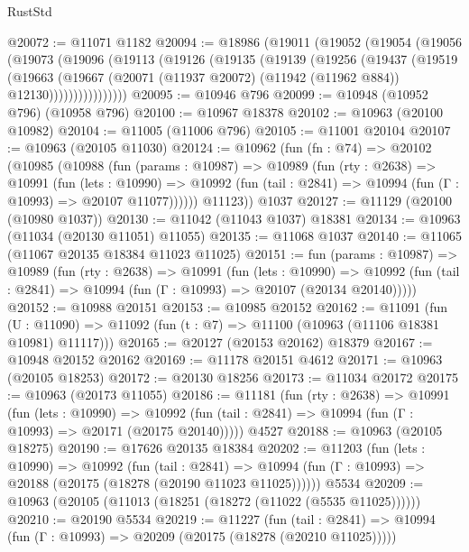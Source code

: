 \begin{lexlean}{RustStd}
\begin{coremodule}
@20072 := @11071 @1182
@20094 := @18986
    (@19011
      (@19052
        (@19054
          (@19056
            (@19073
              (@19096
                (@19113
                  (@19126
                    (@19135
                      (@19139
                        (@19256
                          (@19437
                            (@19519
                              (@19663
                                (@19667
                                  (@20071
                                    (@11937 @20072)
                                    (@11942 (@11962 @884))
                                    @12130))))))))))))))))
@20095 := @10946 @796
@20099 := @10948 (@10952 @796) (@10958 @796)
@20100 := @10967 @18378
@20102 := @10963 (@20100 @10982)
@20104 := @11005 (@11006 @796)
@20105 := @11001 @20104
@20107 := @10963 (@20105 @11030)
@20124 := @10962
    (fun (fn : @74) =>
    @20102
      (@10985
        (@10988
          (fun (params : @10987) =>
          @10989
            (fun (rty : @2638) =>
            @10991
              (fun (lets : @10990) =>
              @10992 (fun (tail : @2841) => @10994 (fun (Γ : @10993) => @20107 @11077))))))
        @11123))
    @1037
@20127 := @11129 (@20100 (@10980 @1037))
@20130 := @11042 (@11043 @1037) @18381
@20134 := @10963 (@11034 (@20130 @11051) @11055)
@20135 := @11068 @1037
@20140 := @11065 (@11067 @20135 @18384 @11023 @11025)
@20151 := fun (params : @10987) =>
  @10989
    (fun (rty : @2638) =>
    @10991
      (fun (lets : @10990) =>
      @10992 (fun (tail : @2841) => @10994 (fun (Γ : @10993) => @20107 (@20134 @20140)))))
@20152 := @10988 @20151
@20153 := @10985 @20152
@20162 := @11091
    (fun (U : @11090) => @11092 (fun (t : @7) => @11100 (@10963 (@11106 @18381 @10981) @11117)))
@20165 := @20127 (@20153 @20162) @18379
@20167 := @10948 @20152 @20162
@20169 := @11178 @20151 @4612
@20171 := @10963 (@20105 @18253)
@20172 := @20130 @18256
@20173 := @11034 @20172
@20175 := @10963 (@20173 @11055)
@20186 := @11181
    (fun (rty : @2638) =>
    @10991
      (fun (lets : @10990) =>
      @10992 (fun (tail : @2841) => @10994 (fun (Γ : @10993) => @20171 (@20175 @20140)))))
    @4527
@20188 := @10963 (@20105 @18275)
@20190 := @17626 @20135 @18384
@20202 := @11203
    (fun (lets : @10990) =>
    @10992
      (fun (tail : @2841) =>
      @10994 (fun (Γ : @10993) => @20188 (@20175 (@18278 (@20190 @11023 @11025))))))
    @5534
@20209 := @10963 (@20105 (@11013 (@18251 (@18272 (@11022 (@5535 @11025))))))
@20210 := @20190 @5534
@20219 := @11227
    (fun (tail : @2841) => @10994 (fun (Γ : @10993) => @20209 (@20175 (@18278 (@20210 @11025)))))

\end{coremodule}
\end{lexlean}
